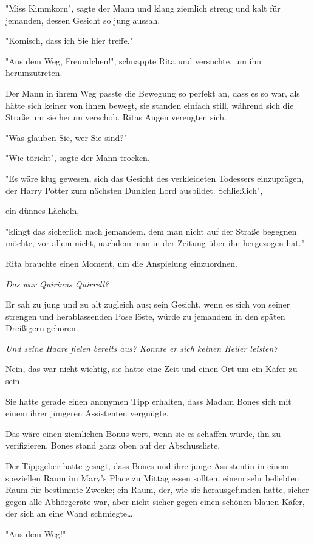 {"Miss Kimmkorn", sagte der Mann und klang ziemlich streng und kalt für jemanden, dessen Gesicht so jung aussah.

"Komisch, dass ich Sie hier treffe."

"Aus dem Weg, Freundchen!", schnappte Rita und versuchte, um ihn herumzutreten.

Der Mann in ihrem Weg passte die Bewegung so perfekt an, dass es so war, als hätte sich keiner von ihnen bewegt, sie standen einfach still, während sich die Straße um sie herum verschob. Ritas Augen verengten sich.

"Was glauben Sie, wer Sie sind?"

"Wie töricht", sagte der Mann trocken.

"Es wäre klug gewesen, sich das Gesicht des verkleideten Todessers einzuprägen, der Harry Potter zum nächsten Dunklen Lord ausbildet. Schließlich",

ein dünnes Lächeln,

"klingt das sicherlich nach jemandem, dem man nicht auf der Straße begegnen möchte, vor allem nicht, nachdem man in der Zeitung über ihn hergezogen hat."

Rita brauchte einen Moment, um die Anspielung einzuordnen.

\emph{Das war Quirinus Quirrell?}

Er sah zu jung und zu alt zugleich aus; sein Gesicht, wenn es sich von seiner strengen und herablassenden Pose löste, würde zu jemandem in den späten Dreißigern gehören.

\emph{Und seine Haare fielen bereits aus? Konnte er sich keinen Heiler leisten?}

Nein, das war nicht wichtig, sie hatte eine Zeit und einen Ort um ein Käfer zu sein.

Sie hatte gerade einen anonymen Tipp erhalten, dass Madam Bones sich mit einem ihrer jüngeren Assistenten vergnügte.

Das wäre einen ziemlichen Bonus wert, wenn sie es schaffen würde, ihn zu verifizieren, Bones stand ganz oben auf der Abschussliste.

Der Tippgeber hatte gesagt, dass Bones und ihre junge Assistentin in einem speziellen Raum im Mary's Place zu Mittag essen sollten, einem sehr beliebten Raum für bestimmte Zwecke; ein Raum, der, wie sie herausgefunden hatte, sicher gegen alle Abhörgeräte war, aber nicht sicher gegen einen schönen blauen Käfer, der sich an eine Wand schmiegte…

"Aus dem Weg!"

}
